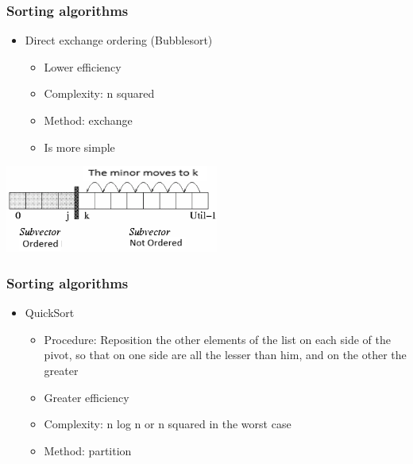 \documentclass[11pt]{beamer}
\begin{document}
\begin{frame}
\frametitle{Sorting algorithms}
\begin{itemize}
\item Direct exchange ordering (Bubblesort)
\begin{itemize}
\item Lower efficiency
\item Complexity: n squared
\item Method: exchange
\item Is more simple
\end{itemize}
\end{itemize}
\begin{center}
\includegraphics[width=7.0cm]{img/burbu.png}
\end{center}
\end{frame}

\begin{frame}
\frametitle{Sorting algorithms}
\begin{itemize}
\item QuickSort
\begin{itemize}
\item Procedure: Reposition the other elements of the list on each side of the pivot, so that on one side are all the lesser than him, and on the other the greater
\item Greater efficiency
\item Complexity: n log n or n squared in the worst case
\item Method: partition
\end{itemize}
\end{itemize}
\end{frame}
\end{document}
